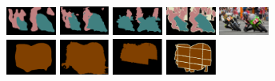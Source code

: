 {\begin{figure}
\begin{subfigure}{0.55\textwidth}
		\includegraphics[width=0.18\textwidth]{image/result/compare/my_motor.png}
		\includegraphics[width=0.18\textwidth]{image/result/compare/fcn_motor.png}
		\includegraphics[width=0.18\textwidth]{image/result/compare/sds_motor.png}
		\includegraphics[width=0.18\textwidth]{image/result/compare/2007_005173.png}
		\includegraphics[width=0.18\textwidth]{image/result/compare/2007_005173.jpg}
		\\
		\includegraphics[width=0.18\textwidth]{image/result/compare/my_sheep.pdf}
		\includegraphics[width=0.18\textwidth]{image/result/compare/fcn_sheep.png}
		\includegraphics[width=0.18\textwidth]{image/result/compare/sds_sheep.png}
		\includegraphics[width=0.18\textwidth]{image/result/compare/gt_sheep.pdf}

\end{subfigure}
\end{figure}}
